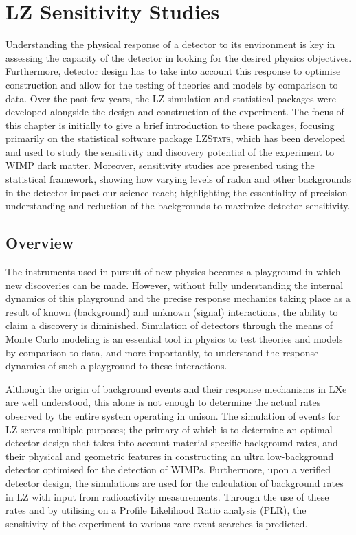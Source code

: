 \chapter{LZ Sensitivity Studies}
\label{chap:chap5}

Understanding the physical response of a detector to its environment is key in assessing the capacity of the detector in looking for the desired physics objectives. Furthermore, detector design has to take into account this response to optimise construction and allow for the testing of theories and models by comparison to data. Over the past few years, the LZ simulation and statistical packages were developed alongside the design and construction of the experiment. The focus of this chapter is initially to give a brief introduction to these packages, focusing primarily on the statistical software package \textsc{LZStats}, which has been developed and used to study the sensitivity and discovery potential of the experiment to WIMP dark matter. Moreover, sensitivity studies are presented using the statistical framework, showing how varying levels of radon and other backgrounds in the detector impact our science reach; highlighting the essentiality of precision understanding and reduction of the backgrounds to maximize detector sensitivity.


\section{Overview}
\label{sec:overview_5}

The instruments used in pursuit of new physics becomes a playground in which new discoveries can be made. However, without fully understanding the internal dynamics of this playground and the precise response mechanics taking place as a result of known (background) and unknown (signal) interactions, the ability to claim a discovery is diminished. Simulation of detectors through the means of Monte Carlo modeling is an essential tool in physics to test theories and models by comparison to data, and more importantly, to understand the response dynamics of such a playground to these interactions. 

Although the origin of background events and their response mechanisms in LXe are well understood, this alone is not enough to determine the actual rates observed by the entire system operating in unison. The simulation of events for LZ serves multiple purposes; the primary of which is to determine an optimal detector design that takes into account material specific background rates, and their physical and geometric features in constructing an ultra low-background detector optimised for the detection of WIMPs. Furthermore, upon a verified detector design, the simulations are used for the calculation of background rates in LZ with input from radioactivity measurements. Through the use of these rates and by utilising on a Profile Likelihood Ratio analysis (PLR), the sensitivity of the experiment to various rare event searches is predicted. 

